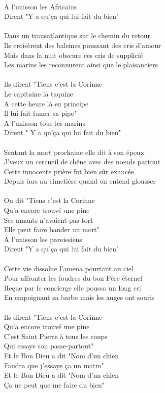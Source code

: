\\A l'unisson les Africains
\\Dirent "Y a qu'ça qui lui fait du bien"
\\\\Dans un transatlantique sur le chemin du retour
\\Ils croisèrent des baleines poussant des cris d'amour
\\Mais dans la nuit obscure ces cris de supplicié
\\Les marins les reconnurent ainsi que le plaisanciers
\\\\Ils dirent "Tiens c'est la Corinne
\\Le capitaine la taquine
\\A cette heure là en principe
\\Il lui fait fumer sa pipe"
\\A l'unisson tous les marins
\\Dirent " Y a qu'ça qui lui fait du bien"
\\\\Sentant la mort prochaine elle dit à son époux
\\J'veux un cercueil de chêne avec des nœuds partout
\\Cette innocente prière fut bien sûr exaucée
\\Depuis lors au cimetière quand on entend glousser
\\\\On dit "Tiens c'est la Corinne
\\Qu'a encore trouvé une pine
\\Ses amants n'avaient pas tort
\\Elle peut faire bander un mort"
\\A l'unisson les paroissiens
\\Dirent "Y a qu'ça qui lui fait du bien"
\\\\Cette vie dissolue l'amena pourtant au ciel
\\Pour affronter les foudres du bon Père éternel
\\Reçue par le concierge elle poussa un long cri
\\En empoignant sa barbe mais les anges ont souris
\\\\Ils dirent "Tiens c'est la Corinne
\\Qu'a encore trouvé une pine
\\C'est Saint Pierre à tous les coups
\\Qui essaye son passe-partout"
\\Et le Bon Dieu a dit "Nom d'un chien
\\Faudra que j'essaye ça un matin"
\\Et le Bon Dieu a dit "Nom d'un chien
\\Ça ne peut que me faire du bien"
\breakpage
